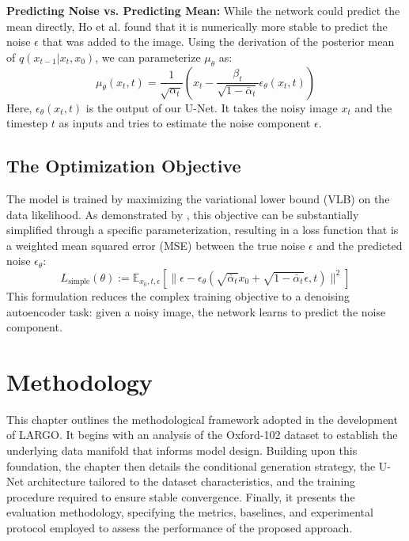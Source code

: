 \documentclass[12pt, a4paper]{article}
\begin{document}
\textbf{Predicting Noise vs. Predicting Mean:} While the network could predict the mean directly, Ho et al. \cite{ho2020} found that it is numerically more stable to predict the noise $\epsilon$ that was added to the image. Using the derivation of the posterior mean of $q(x_{t-1}|x_t, x_0)$, we can parameterize $\mu_\theta$ as:
\begin{equation}
    \mu_\theta(x_t, t) = \frac{1}{\sqrt{\alpha_t}} \left(x_t-\frac{\beta_t}{\sqrt{1-\bar{\alpha}_t}} \epsilon_\theta(x_t, t) \right)
\end{equation}
Here, $\epsilon_\theta(x_t, t)$ is the output of our U-Net. It takes the noisy image $x_t$ and the timestep $t$ as inputs and tries to estimate the noise component $\epsilon$.

\subsection{The Optimization Objective}
The model is trained by maximizing the variational lower bound (VLB) on the data likelihood. As demonstrated by \cite{arxiv2006}, this objective can be substantially simplified through a specific parameterization, resulting in a loss function that is a weighted mean squared error (MSE) between the true noise $\epsilon$ and the predicted noise $\epsilon_\theta$:
\begin{equation}
    L_{\text{simple}}(\theta) := \mathbb{E}_{x_0, t, \epsilon} \left[ \| \epsilon - \epsilon_\theta(\sqrt{\bar{\alpha}_t} x_0 + \sqrt{1-\bar{\alpha}_t} \epsilon, t) \|^2 \right]
\end{equation}
This formulation reduces the complex training objective to a denoising autoencoder task: given a noisy image, the network learns to predict the noise component.

\section{Methodology}

This chapter outlines the methodological framework adopted in the development of LARGO. It begins with an analysis of the Oxford-102 dataset to establish the underlying data manifold that informs model design. Building upon this foundation, the chapter then details the conditional generation strategy, the U-Net architecture tailored to the dataset characteristics, and the training procedure required to ensure stable convergence. Finally, it presents the evaluation methodology, specifying the metrics, baselines, and experimental protocol employed to assess the performance of the proposed approach.
\end{document}
